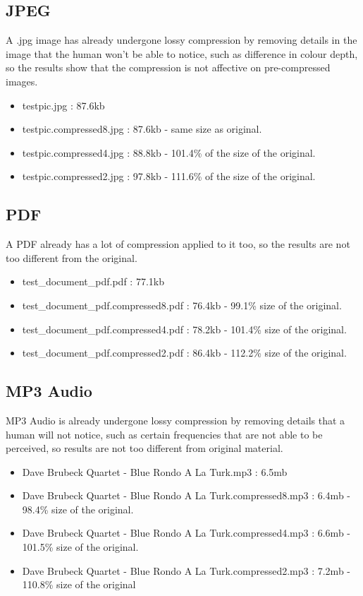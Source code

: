 \documentclass[12pt, letterpaper]{article}
\begin{document}
\subsection{JPEG}
A .jpg image has already undergone lossy compression by removing details in the image that the human won't be able to notice, such as difference in colour depth, so the results show that the compression is not affective on pre-compressed images.
\begin{itemize}
  \item testpic.jpg : 87.6kb 
  \item testpic.compressed8.jpg :  87.6kb - same size as original.
  \item testpic.compressed4.jpg : 88.8kb - 101.4\% of the size of the original.
  \item testpic.compressed2.jpg : 97.8kb - 111.6\% of the size of the original.
\end{itemize}
\subsection{PDF}
A PDF already has a lot of compression applied to it too, so the results are not too different from the original.
\begin{itemize}
  \item test\_document\_pdf.pdf : 77.1kb 
  \item test\_document\_pdf.compressed8.pdf :  76.4kb - 99.1\% size of the original.
  \item test\_document\_pdf.compressed4.pdf : 78.2kb - 101.4\% size of the original.
  \item test\_document\_pdf.compressed2.pdf : 86.4kb - 112.2\% size of the original.
\end{itemize}
\subsection{MP3 Audio}
MP3 Audio is already undergone lossy compression by removing details that a human will not notice, such as certain frequencies that are not able to be perceived, so results are not too different from original material.
\begin{itemize}
  \item Dave Brubeck Quartet - Blue Rondo A La Turk.mp3 : 6.5mb 
  \item Dave Brubeck Quartet - Blue Rondo A La Turk.compressed8.mp3 :  6.4mb - 98.4\% size of the original.
  \item Dave Brubeck Quartet - Blue Rondo A La Turk.compressed4.mp3 : 6.6mb - 101.5\% size of the original.
  \item Dave Brubeck Quartet - Blue Rondo A La Turk.compressed2.mp3 : 7.2mb - 110.8\% size of the original
\end{itemize}
\end{document}
